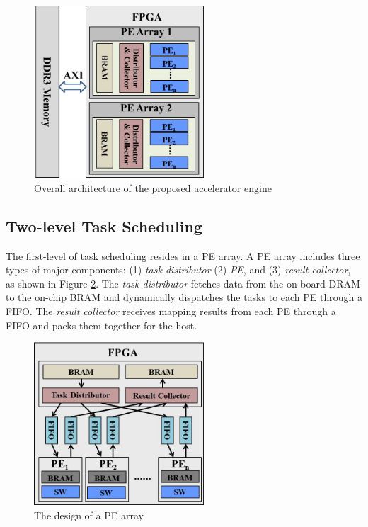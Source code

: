 \begin{figure}[!hbt]
\begin{center}
\includegraphics[width=2.5in]{Figures/Figure_Arch1.jpg}
\caption {Overall architecture of the proposed accelerator engine} \label{fig:overall_architecture} \end{center} \end{figure}
\vspace{-10pt}

\subsection{Two-level Task Scheduling}

The first-level of task scheduling resides in a PE array. 
A PE array includes three types of major components: (1) \textit{task distributor} (2) \textit{PE}, and (3) \textit{result collector}, 
as shown in Figure \ref{fig:schedule_structure}.
The \textit{task distributor} fetches data from the on-board DRAM to the on-chip BRAM and dynamically dispatches the tasks to each PE through a FIFO.
The \textit{result collector} receives mapping results from each PE through a FIFO and packs them together for the host.

\begin{figure}[!hbt]
\begin{center}
\includegraphics[width=2.5in]{Figures/Figure_Arch2.jpg}
\caption {The design of a PE array} \label{fig:schedule_structure} \end{center} \end{figure}
\vspace{-10pt}


